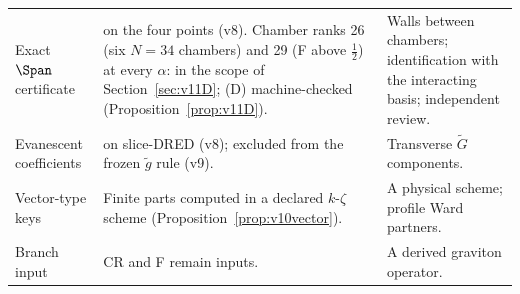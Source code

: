 \begin{longtable}{@{}L{.22\linewidth}L{.40\linewidth}L{.31\linewidth}@{}}
Exact \(\Span\) certificate &
\CPIR{} on the four points (v8). Chamber ranks 26 (six \(N=34\)
chambers) and 29 (F above \(\tfrac12\)) at every \(\alpha\):
\CPIR{} in the scope of Section~\ref{sec:v11D}; (D) machine-checked
(Proposition~\ref{prop:v11D}). &
Walls between chambers; identification with the
interacting basis; independent review.\\

Evanescent coefficients &
\CONDITIONAL{} on slice-DRED (v8); excluded from the frozen
\(\tilde g\) rule (v9). &
Transverse \(\tilde G\) components.\\

Vector-type keys &
Finite parts computed in a declared \(k\)-\(\zeta\) scheme
(Proposition~\ref{prop:v10vector}). &
A physical scheme; profile Ward partners.\\

Branch input &
CR and F remain inputs. &
A derived graviton operator.\\
\end{longtable}
\endgroup
